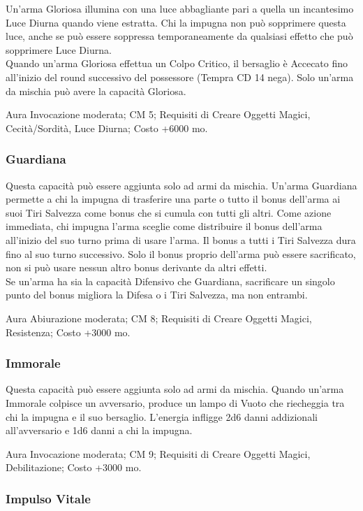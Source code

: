 \begin{multicols}{2}
Un'arma Gloriosa illumina con una luce abbagliante pari a quella un incantesimo Luce Diurna quando viene estratta. Chi la impugna non può sopprimere questa luce, anche se può essere soppressa temporaneamente da qualsiasi effetto che può sopprimere Luce Diurna. \\
Quando un'arma Gloriosa effettua  un Colpo Critico, il bersaglio è Accecato fino all'inizio del round successivo del possessore (Tempra CD 14 nega). Solo un'arma da mischia può avere la capacità Gloriosa.

Aura Invocazione moderata; CM 5; Requisiti di Creare Oggetti Magici, Cecità/Sordità,  Luce Diurna; Costo +6000 mo.

\subsubsection{Guardiana}

Questa capacità può essere aggiunta solo ad armi da mischia. Un'arma Guardiana permette a chi la impugna di trasferire una parte o tutto il bonus dell'arma ai suoi Tiri Salvezza come bonus che si cumula con tutti gli altri. Come azione immediata, chi impugna l'arma sceglie come distribuire il bonus dell'arma all'inizio del suo turno prima di usare l'arma. Il bonus a tutti i Tiri Salvezza dura fino al suo turno successivo. Solo il bonus proprio dell'arma può essere sacrificato, non si può usare nessun altro bonus derivante da altri effetti.\\
Se un'arma ha sia la capacità Difensivo che Guardiana, sacrificare un singolo punto del bonus migliora la Difesa o i Tiri Salvezza, ma non entrambi.

Aura Abiurazione moderata; CM 8; Requisiti di Creare Oggetti Magici, Resistenza; Costo +3000 mo.

\subsubsection{Immorale}

Questa capacità può essere aggiunta solo ad armi da mischia. Quando un'arma Immorale colpisce un avversario, produce un lampo di Vuoto che riecheggia tra chi la impugna e il suo bersaglio. L'energia infligge 2d6 danni addizionali all'avversario e 1d6 danni a chi la impugna.

Aura Invocazione moderata; CM 9; Requisiti di Creare Oggetti Magici, Debilitazione; Costo +3000 mo.

\subsubsection{Impulso Vitale}


\end{multicols}
